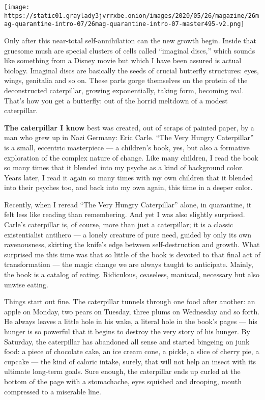 \texttt{[image: https://static01.graylady3jvrrxbe.onion/images/2020/05/26/magazine/26mag-quarantine-intro-07/26mag-quarantine-intro-07-master495-v2.png]}

Only after this near-total self-annihilation can the new growth begin.
Inside that gruesome mush are special clusters of cells called
``imaginal discs,'' which sounds like something from a Disney movie but
which I have been assured is actual biology. Imaginal discs are
basically the seeds of crucial butterfly structures: eyes, wings,
genitalia and so on. These parts gorge themselves on the protein of the
deconstructed caterpillar, growing exponentially, taking form, becoming
real. That's how you get a butterfly: out of the horrid meltdown of a
modest caterpillar.

\textbf{The caterpillar I know} best was created, out of scraps of
painted paper, by a man who grew up in Nazi Germany: Eric Carle. ``The
Very Hungry Caterpillar'' is a small, eccentric masterpiece --- a
children's book, yes, but also a formative exploration of the complex
nature of change. Like many children, I read the book so many times that
it blended into my psyche as a kind of background color. Years later, I
read it again so many times with my own children that it blended into
their psyches too, and back into my own again, this time in a deeper
color.

Recently, when I reread ``The Very Hungry Caterpillar'' alone, in
quarantine, it felt less like reading than remembering. And yet I was
also slightly surprised. Carle's caterpillar is, of course, more than
just a caterpillar; it is a classic existentialist antihero --- a lonely
creature of pure need, guided by only its own ravenousness, skirting the
knife's edge between self-destruction and growth. What surprised me this
time was that so little of the book is devoted to that final act of
transformation --- the magic change we are always taught to anticipate.
Mainly, the book is a catalog of eating. Ridiculous, ceaseless,
maniacal, necessary but also unwise eating.

Things start out fine. The caterpillar tunnels through one food after
another: an apple on Monday, two pears on Tuesday, three plums on
Wednesday and so forth. He always leaves a little hole in his wake, a
literal hole in the book's pages --- his hunger is so powerful that it
begins to destroy the very story of his hunger. By Saturday, the
caterpillar has abandoned all sense and started bingeing on junk food: a
piece of chocolate cake, an ice cream cone, a pickle, a slice of cherry
pie, a cupcake --- the kind of caloric intake, surely, that will not
help an insect with its ultimate long-term goals. Sure enough, the
caterpillar ends up curled at the bottom of the page with a stomachache,
eyes squished and drooping, mouth compressed to a miserable line.

